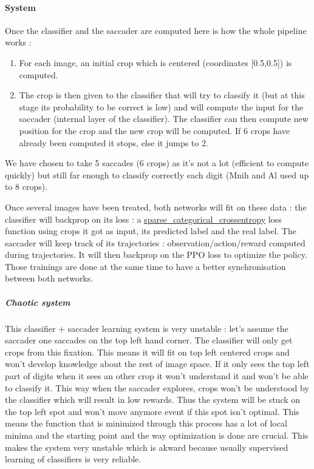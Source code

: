 \documentclass[11pt]{article}
\begin{document}
\paragraph{System}
Once the classifier and the saccader are computed here is how the whole pipeline works :
\begin{enumerate}
\item For each image, an initial crop which is centered (coordinates [0.5,0.5]) is computed. 

\item The crop is then given to the classifier that will try to classify it (but at this stage its probability to be correct is low) and will compute the input for the saccader (internal layer of the classifier). The classifier can then compute new position for the crop and the new crop will be computed. If 6 crops have already been computed it stops, else it jumps to 2.
\end{enumerate}
We have chosen to take 5 saccades (6 crops) as it's not a lot (efficient to compute quickly) but still far enough to classify correctly each digit (Mnih and Al used up to 8 crops).

Once several images have been treated, both networks will fit on these data : the classifier will backprop on its loss : a \underline{sparse\_categorical\_crossentropy} loss function using crops it got as input, its predicted label and the real label. The saccader will keep track of its trajectories : observation/action/reward computed during trajectories. It will then backprop on the PPO loss to optimize the policy. Those trainings are done at the same time to have a better synchronisation between both networks.
\subparagraph{Chaotic system}
This classifier + saccader learning system is very unstable : let's assume the saccader one saccades on the top left hand corner. The classifier will only get crops from this fixation. This means it will fit on top left centered crops and won't develop knowledge about the rest of image space. If it only sees the top left part of digits when it sees an other crop it won't understand it and won't be able to classify it. This way when the saccader explores, crops won't be understood by the classifier which will result in low rewards. Thus the system will be stuck on the top left spot and won't move anymore event if this spot isn't optimal. This means the function that is minimized through this process has a lot of local minima and the starting point and the way optimization is done are crucial. This makes the system very unstable which is akward because usually supervised learning of classifiers is very reliable.
\end{document}
